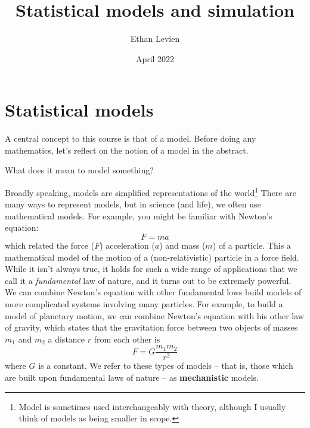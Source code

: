 

\title{\Huge \color{C1} Statistical models and simulation}
\author{\color{C1} Ethan Levien}
\date{April 2022}



\maketitle

\tableofcontents



\section{Statistical models}
A central concept to this course is that of a {\dfn model}. Before doing any mathematics, let's reflect on the notion of a model in the abstract.

\begin{exercise}
What does it mean to model something?
\end{exercise}




Broadly speaking, models are simplified representations of the world\footnote{Model is sometimes used interchangeably with {\dfn theory}, although I usually think of models as being smaller in scope.} There are many ways to represent models, but in science (and life), we often use {\dfn mathematical models}.
For example, you might be familiar with Newton's equation:
\begin{equation}\label{eq:fma}
F = ma
\end{equation}
which related the force ($F$) acceleration ($a$) and mass ($m$) of a particle. This a mathematical model of the motion of a  (non-relativistic) particle in a force field. While it isn't always true, it holds for such a wide range of applications that we call it a \emph{fundamental} law of nature, and it turns out to be extremely powerful. We can combine Newton's equation with other fundamental lows build models of more complicated systems involving many particles. For example, to build a model of planetary motion, we can combine Newton's equation with his other law of gravity, which states that the gravitation force between two objects of masses $m_1$ and $m_2$ a distance $r$ from each other is
\begin{equation}
F = G\frac{m_1m_2}{r^2}
\end{equation}
where $G$ is a constant.
We refer to these types of models -- that is, those which are built upon fundamental laws of nature -- as {\bf mechanistic} models.


